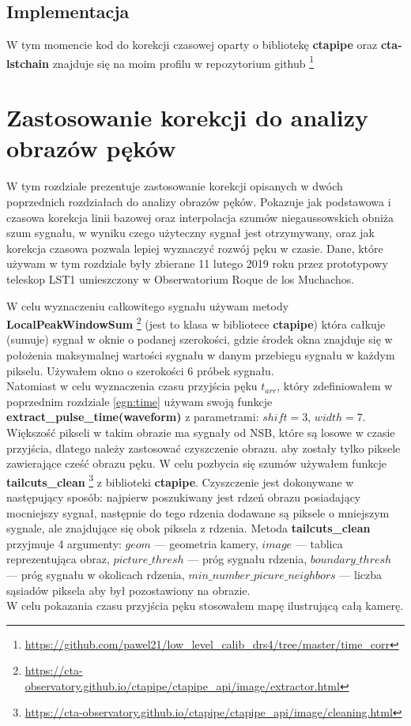 \documentclass[a4paper,11pt,twoside]{article}
\begin{document}
\subsection{Implementacja}
W tym momencie kod do korekcji czasowej oparty o bibliotekę {\bf{ctapipe}} oraz {\bf{cta-lstchain}} znajduje się na moim profilu w repozytorium github \footnote{\url{https://github.com/pawel21/low_level_calib_drs4/tree/master/time_corr}}
\newpage
\section{Zastosowanie korekcji do analizy obrazów pęków}
W tym rozdziale prezentuje zastosowanie korekcji opisanych w dwóch poprzednich rozdziałach do analizy obrazów pęków. Pokazuje jak podstawowa i czasowa korekcja linii bazowej oraz interpolacja szumów niegaussowskich obniża szum sygnału, w wyniku czego użyteczny sygnał jest otrzymywany, oraz jak korekcja czasowa pozwala lepiej wyznaczyć rozwój pęku w czasie. Dane, które używam w tym rozdziale były zbierane 11 lutego 2019 roku przez prototypowy teleskop LST1 umieszczony w Obserwatorium Roque de los Muchachos. 

W celu wyznaczeniu całkowitego sygnału używam metody {\bf{LocalPeakWindowSum}} \footnote{\url{https://cta-observatory.github.io/ctapipe/ctapipe_api/image/extractor.html}} (jest to klasa w bibliotece {\bf{ctapipe}}) która całkuje (sumuje) sygnał w oknie o podanej szerokości, gdzie środek okna znajduje się w położenia maksymalnej wartości sygnału w danym przebiegu sygnału w każdym pikselu. Używałem okno o szerokości 6 próbek sygnału. \\ 
Natomiast w celu wyznaczenia czasu przyjścia pęku $t_{arr}$, który zdefiniowałem w poprzednim rozdziale \ref{egn:time} używam swoją funkcje {\bf{extract\_pulse\_time(waveform)}} z parametrami: $shift = 3$, $width = 7$. \\
Większość pikseli w takim obrazie ma sygnały od NSB, które są losowe w czasie przyjścia, dlatego należy zastosować czyszczenie obrazu. aby zostały tylko piksele zawierające cześć obrazu pęku. W celu pozbycia się szumów używałem funkcje {\bf{tailcuts\_clean}} \footnote{ \url{https://cta-observatory.github.io/ctapipe/ctapipe_api/image/cleaning.html}} z biblioteki {\bf{ctapipe}}. Czyszczenie jest dokonywane w następujący sposób: najpierw poszukiwany jest rdzeń obrazu posiadający mocniejszy sygnał, następnie do tego rdzenia dodawane są piksele o mniejszym sygnale, ale znajdujące się obok piksela z rdzenia. Metoda {\bf{tailcuts\_clean}} przyjmuje 4 argumenty: $geom$ --- geometria kamery, $image$ --- tablica reprezentująca obraz, $picture\_thresh$ --- próg sygnału rdzenia, $boundary\_thresh$ --- próg sygnału w okolicach rdzenia, $min\_number\_picure\_neighbors$ --- liczba sąsiadów piksela aby był pozostawiony na obrazie. \\
W celu pokazania czasu przyjścia pęku stosowałem mapę ilustrującą całą kamerę.
\end{document}

